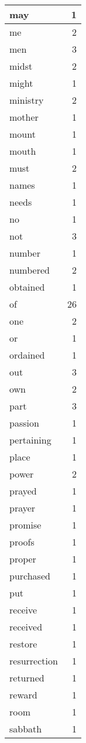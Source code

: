 \begin{center}
\begin{longtable}{l|r}
may & 1 \\ \hline
me & 2 \\ \hline
men & 3 \\ \hline
midst & 2 \\ \hline
might & 1 \\ \hline
ministry & 2 \\ \hline
mother & 1 \\ \hline
mount & 1 \\ \hline
mouth & 1 \\ \hline
must & 2 \\ \hline
names & 1 \\ \hline
needs & 1 \\ \hline
no & 1 \\ \hline
not & 3 \\ \hline
number & 1 \\ \hline
numbered & 2 \\ \hline
obtained & 1 \\ \hline
of & 26 \\ \hline
one & 2 \\ \hline
or & 1 \\ \hline
ordained & 1 \\ \hline
out & 3 \\ \hline
own & 2 \\ \hline
part & 3 \\ \hline
passion & 1 \\ \hline
pertaining & 1 \\ \hline
place & 1 \\ \hline
power & 2 \\ \hline
prayed & 1 \\ \hline
prayer & 1 \\ \hline
promise & 1 \\ \hline
proofs & 1 \\ \hline
proper & 1 \\ \hline
purchased & 1 \\ \hline
put & 1 \\ \hline
receive & 1 \\ \hline
received & 1 \\ \hline
restore & 1 \\ \hline
resurrection & 1 \\ \hline
returned & 1 \\ \hline
reward & 1 \\ \hline
room & 1 \\ \hline
sabbath & 1 \\ \hline

\end{longtable}
\end{center}
